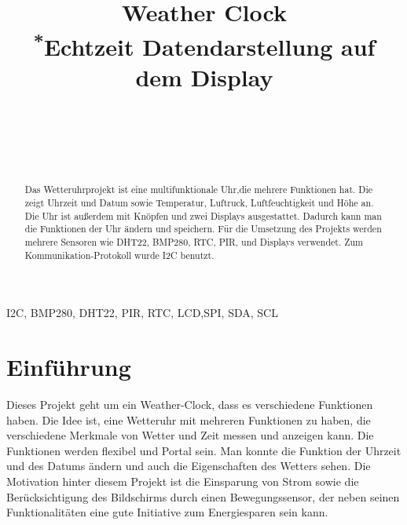 \documentclass[conference]{IEEEtran}
\begin{document}
\title{Weather Clock\\
{\footnotesize \textsuperscript{*}Echtzeit Datendarstellung auf dem Display}
}

\author{ \\
 \\
\and
{} \\
}

\maketitle

\begin{abstract}
Das Wetteruhrprojekt ist eine multifunktionale Uhr,die  mehrere Funktionen hat. Die zeigt Uhrzeit und Datum sowie Temperatur, Luftruck, Luftfeuchtigkeit und Höhe an. Die Uhr ist außerdem mit Knöpfen und zwei Displays ausgestattet. Dadurch kann man die Funktionen der Uhr ändern und speichern. Für die Umsetzung des Projekts werden mehrere Sensoren wie DHT22, BMP280, RTC, PIR, und Displays verwendet. Zum Kommunikation-Protokoll wurde I2C benutzt.
\end{abstract}

\begin{IEEEkeywords}
I2C, BMP280, DHT22, PIR, RTC, LCD,SPI, SDA, SCL
\end{IEEEkeywords}

\section{Einführung}
Dieses Projekt geht um ein Weather-Clock, dass es verschiedene Funktionen haben. Die Idee ist, eine Wetteruhr mit mehreren Funktionen zu haben, die verschiedene Merkmale von Wetter und Zeit messen und anzeigen kann. Die Funktionen werden flexibel und Portal sein. Man konnte die Funktion der Uhrzeit und des Datums ändern und auch die Eigenschaften des Wetters sehen. Die Motivation hinter diesem Projekt ist die Einsparung von Strom sowie die Berücksichtigung des Bildschirms durch einen Bewegungssensor, der neben seinen Funktionalitäten eine gute Initiative zum Energiesparen sein kann.
\end{document}
